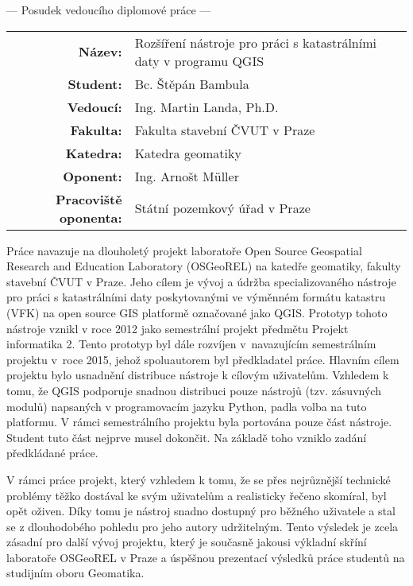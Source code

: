 \documentclass[czech,11pt,a4paper]{article}
\begin{document}
\begin{center}
  {\Large --- Posudek vedoucího diplomové práce ---}
\end{center}

\vspace{.2cm}

\noindent \begin{tabular}{rp{}}
  {\bf Název:} & Rozšíření nástroje pro práci s katastrálními daty v programu QGIS \\
  {\bf Student:} & Bc. Štěpán Bambula \\
  {\bf Vedoucí:} & Ing. Martin Landa, Ph.D. \\
  {\bf Fakulta:} & Fakulta stavební ČVUT v Praze \\ 
  {\bf Katedra:} & Katedra geomatiky \\
  {\bf Oponent:} & Ing. Arnošt Müller \\
  {\bf Pracoviště oponenta:} & Státní pozemkový úřad v Praze \\
\end{tabular}

\vspace{1cm}

Práce navazuje na dlouholetý projekt laboratoře Open Source Geospatial
Research and Education Laboratory (OSGeoREL) na katedře geomatiky,
fakulty stavební ČVUT v Praze. Jeho cílem je vývoj a údržba
specializovaného nástroje pro práci s katastrálními daty poskytovanými
ve výměnném formátu katastru (VFK) na open source GIS platformě
označované jako QGIS. Prototyp tohoto nástroje vznikl v roce 2012 jako
semestrální projekt předmětu Projekt informatika 2. Tento prototyp byl
dále rozvíjen v~navazujícím semestrálním projektu v~roce 2015, jehož
spoluautorem byl předkladatel práce. Hlavním cílem projektu bylo usnadnění
distribuce nástroje k cílovým uživatelům. Vzhledem k tomu, že QGIS
podporuje snadnou distribuci pouze nástrojů (tzv. zásuvných modulů)
napsaných v programovacím jazyku Python, padla volba na tuto
platformu. V rámci semestrálního projektu byla portována pouze část
nástroje. Student tuto část nejprve musel dokončit. Na základě toho
vzniklo zadání předkládané práce. \newline

V rámci práce projekt, který vzhledem k tomu, že se přes
nejrůznější technické problémy těžko dostával ke svým uživatelům a
realisticky řečeno skomíral, byl opět oživen. Díky tomu je nástroj snadno
dostupný pro běžného uživatele a stal se z dlouhodobého pohledu pro
jeho autory udržitelným. Tento výsledek je zcela zásadní pro další
vývoj projektu, který je současně jakousi výkladní skříní laboratoře
OSGeoREL v Praze a úspěšnou prezentací výsledků práce studentů na
studijním oboru Geomatika. \newline
\end{document}
